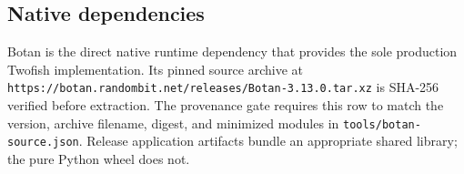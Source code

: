 \documentclass[
  letterpaper,
]{article}
\begin{document}
\begin{landscape}

\subsection{Native dependencies}\label{native-dependencies}

Botan is the direct native runtime dependency that provides the sole production Twofish implementation. Its pinned
source archive at \nolinkurl{https://botan.randombit.net/releases/Botan-3.13.0.tar.xz} is SHA-256 verified before
extraction. The provenance gate requires this row to match the version, archive filename, digest, and minimized modules
in \nolinkurl{tools/botan-source.json}. Release application artifacts bundle an appropriate shared library; the pure
Python wheel does not.


\end{landscape}
\end{document}
